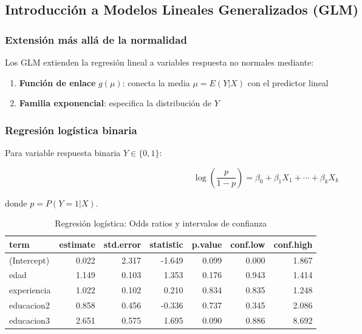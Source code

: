 \documentclass[
  oneside]{book}
\providecommand{\tightlist}{%
  \setlength{\itemsep}{0pt}\setlength{\parskip}{0pt}}
\begin{document}
\subsection{Introducción a Modelos Lineales Generalizados (GLM)}\label{introducciuxf3n-a-modelos-lineales-generalizados-glm}

\subsubsection{Extensión más allá de la normalidad}\label{extensiuxf3n-muxe1s-alluxe1-de-la-normalidad}

Los GLM extienden la regresión lineal a variables respuesta no normales mediante:

\begin{enumerate}
\def\labelenumi{\arabic{enumi}.}
\tightlist
\item
  \textbf{Función de enlace} \(g(\mu)\): conecta la media \(\mu = E(Y|X)\) con el predictor lineal
\item
  \textbf{Familia exponencial}: especifica la distribución de \(Y\)
\end{enumerate}

\subsubsection{Regresión logística binaria}\label{regresiuxf3n-loguxedstica-binaria}

Para variable respuesta binaria \(Y \in \{0,1\}\):

\begin{equation}
\log\left(\frac{p}{1-p}\right) = \beta_0 + \beta_1 X_1 + \cdots + \beta_k X_k
\end{equation}

donde \(p = P(Y=1|X)\).

\begin{table}
\centering
\caption{\label{tab:regresion-logistica}Regresión logística: Odds ratios y intervalos de confianza}
\centering
\begin{tabular}[t]{l|r|r|r|r|r|r}
\hline
term & estimate & std.error & statistic & p.value & conf.low & conf.high\\
\hline
(Intercept) & 0.022 & 2.317 & -1.649 & 0.099 & 0.000 & 1.867\\
\hline
edad & 1.149 & 0.103 & 1.353 & 0.176 & 0.943 & 1.414\\
\hline
experiencia & 1.022 & 0.102 & 0.210 & 0.834 & 0.835 & 1.248\\
\hline
educacion2 & 0.858 & 0.456 & -0.336 & 0.737 & 0.345 & 2.086\\
\hline
educacion3 & 2.651 & 0.575 & 1.695 & 0.090 & 0.886 & 8.692\\
\hline
\end{tabular}
\end{table}
\end{document}
